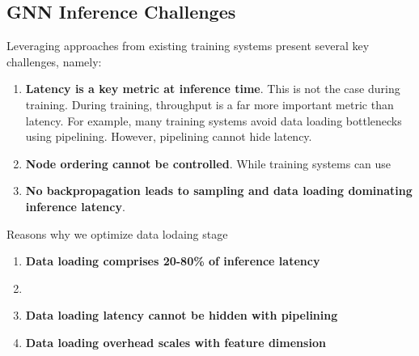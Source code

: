 

\subsection{GNN Inference Challenges}
Leveraging approaches from existing training systems present several key challenges, namely:

\begin{enumerate}
    \item \textbf{Latency is a key metric at inference time}. This is not the case during training. During training, throughput is a far more important metric than latency. For example, many training systems avoid data loading bottlenecks using pipelining. However, pipelining cannot hide latency.
    \item \textbf{Node ordering cannot be controlled}. While training systems can use 
    \item \textbf{No backpropagation leads to sampling and data loading dominating inference latency}. 
\end{enumerate}

Reasons why we optimize data lodaing stage
\begin{enumerate}
    \item \textbf{Data loading comprises 20-80\% of inference latency}
    \item \item \textbf{Data loading latency cannot be hidden with pipelining}
    \item \textbf{Data loading overhead scales with feature dimension}
\end{enumerate}


